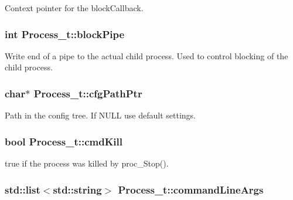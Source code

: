Context pointer for the block\+Callback. 

\subsubsection[{\texorpdfstring{block\+Pipe}{blockPipe}}]{\setlength{\rightskip}{0pt plus 5cm}int Process\+\_\+t\+::block\+Pipe}\hypertarget{struct_process__t_a9397d79212672a8b5a6737371e258f1c}{}\label{struct_process__t_a9397d79212672a8b5a6737371e258f1c}
Write end of a pipe to the actual child process. Used to control blocking of the child process. 
\subsubsection[{\texorpdfstring{cfg\+Path\+Ptr}{cfgPathPtr}}]{\setlength{\rightskip}{0pt plus 5cm}char$\ast$ Process\+\_\+t\+::cfg\+Path\+Ptr}\hypertarget{struct_process__t_af716106d703f24120088f731eecf3bcd}{}\label{struct_process__t_af716106d703f24120088f731eecf3bcd}


Path in the config tree. If N\+U\+LL use default settings. 

\subsubsection[{\texorpdfstring{cmd\+Kill}{cmdKill}}]{\setlength{\rightskip}{0pt plus 5cm}bool Process\+\_\+t\+::cmd\+Kill}\hypertarget{struct_process__t_ac3a5f2a7ded7c950a2b729ccd485aa3e}{}\label{struct_process__t_ac3a5f2a7ded7c950a2b729ccd485aa3e}


true if the process was killed by proc\+\_\+\+Stop(). 

\subsubsection[{\texorpdfstring{command\+Line\+Args}{commandLineArgs}}]{\setlength{\rightskip}{0pt plus 5cm}std\+::list$<$std\+::string$>$ Process\+\_\+t\+::command\+Line\+Args}\hypertarget{struct_process__t_afcdf1ba1b64dbc4e8d7cdfb4e3064ef6}{}\label{struct_process__t_afcdf1ba1b64dbc4e8d7cdfb4e3064ef6}
